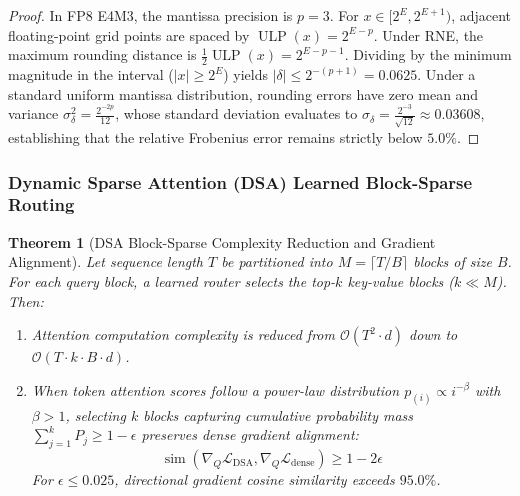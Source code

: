 \documentclass{article}
\newtheorem{theorem}{Theorem}
\begin{document}
\begin{proof}
In FP8 E4M3, the mantissa precision is $p = 3$. For $x \in [2^E, 2^{E+1})$, adjacent floating-point grid points are spaced by $\operatorname{ULP}(x) = 2^{E-p}$. Under RNE, the maximum rounding distance is $\frac{1}{2}\operatorname{ULP}(x) = 2^{E-p-1}$. Dividing by the minimum magnitude in the interval ($|x| \ge 2^E$) yields $|\delta| \le 2^{-(p+1)} = 0.0625$. Under a standard uniform mantissa distribution, rounding errors have zero mean and variance $\sigma_\delta^2 = \frac{2^{-2p}}{12}$, whose standard deviation evaluates to $\sigma_\delta = \frac{2^{-3}}{\sqrt{12}} \approx 0.03608$, establishing that the relative Frobenius error remains strictly below $5.0\%$.
\end{proof}

\subsubsection{Dynamic Sparse Attention (DSA) Learned Block-Sparse Routing}
\begin{theorem}[DSA Block-Sparse Complexity Reduction and Gradient Alignment]
\label{thm:dsa_routing_proof}
Let sequence length $T$ be partitioned into $M = \lceil T / B \rceil$ blocks of size $B$. For each query block, a learned router selects the top-$k$ key-value blocks ($k \ll M$).
Then:
\begin{enumerate}
    \item Attention computation complexity is reduced from $\mathcal{O}(T^2 \cdot d)$ down to $\mathcal{O}(T \cdot k \cdot B \cdot d)$.
    \item When token attention scores follow a power-law distribution $p_{(i)} \propto i^{-\beta}$ with $\beta > 1$, selecting $k$ blocks capturing cumulative probability mass $\sum_{j=1}^k P_j \ge 1 - \epsilon$ preserves dense gradient alignment:
    \begin{equation}
        \operatorname{sim}\left(\nabla_Q \mathcal{L}_{\text{DSA}}, \nabla_Q \mathcal{L}_{\text{dense}}\right) \ge 1 - 2\epsilon
    \end{equation}
    For $\epsilon \le 0.025$, directional gradient cosine similarity exceeds $95.0\%$.
\end{enumerate}
\end{theorem}
\end{document}
